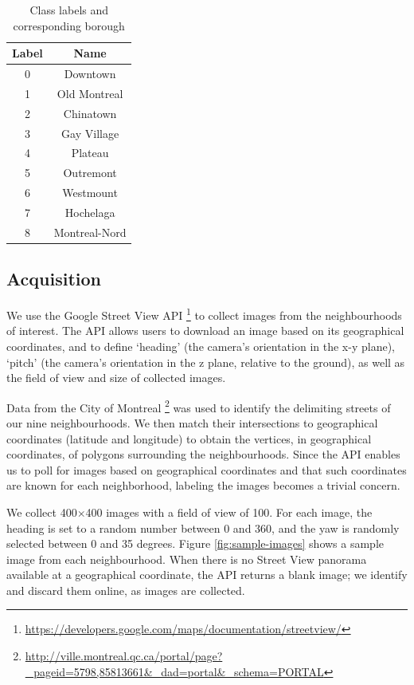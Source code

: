 \documentclass{acm_proc_article-sp}
\begin{document}
\begin{table}[h!]
\caption{Class labels and corresponding borough}
\label{tbl:boroughlist}
\centering
\begin{tabular}{| c | c |}
\hline
\textbf{Label} & \textbf{Name} \\ \hline 
0 & Downtown \\
1 & Old Montreal \\
2 & Chinatown \\
3 & Gay Village \\
4 & Plateau \\
5 & Outremont \\
6 & Westmount \\
7 & Hochelaga \\
8 & Montreal-Nord \\ \hline
\end{tabular}
\end{table}

\subsection{Acquisition}
We use the Google Street View API \footnote{\url{https://developers.google.com/maps/documentation/streetview/}} to collect images from the neighbourhoods of interest. The API allows users to download an image based on its geographical coordinates, and to define `heading' (the camera's orientation in the x-y plane), `pitch' (the camera's orientation in the z plane, relative to the ground), as well as the field of view and size of collected images. 

Data from the City of Montreal \footnote{\url{http://ville.montreal.qc.ca/portal/page?_pageid=5798,85813661&_dad=portal&_schema=PORTAL}} was used to identify the delimiting streets of our nine neighbourhoods. We then match their intersections to geographical coordinates (latitude and longitude) to obtain the vertices, in geographical coordinates, of polygons surrounding the neighbourhoods.  Since the API enables us to poll for images based on geographical coordinates and that such coordinates are known for each neighborhood, labeling the images becomes a trivial concern.

We collect 400$\times$400 images with a field of view of 100. For each image, the heading is set to a random number between 0 and 360, and the yaw is randomly selected between 0 and 35 degrees. Figure \ref{fig:sample-images} shows a sample image from each neighbourhood. When there is no Street View panorama available at a geographical coordinate, the API returns a blank image; we identify and discard them online, as images are collected.
\end{document}
